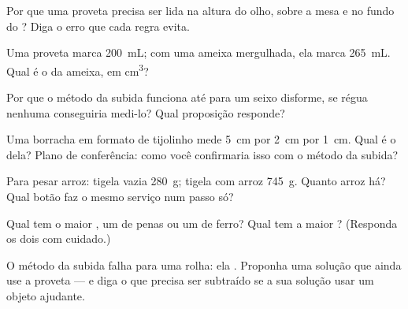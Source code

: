 \begin{exercise}[$\star$]\label{exo:g6:mass-and-volume:3}
Por que uma proveta precisa ser lida na altura do olho, sobre a mesa
e no fundo do ? Diga o erro que cada regra evita.
\end{exercise}

\begin{exercise}[$\star$]\label{exo:g6:mass-and-volume:4}
Uma proveta marca \qty{200}{mL}; com uma ameixa mergulhada, ela marca
\qty{265}{mL}. Qual é o  da ameixa, em \unit{cm^3}?
\end{exercise}

\begin{exercise}[$\star$]\label{exo:g6:mass-and-volume:5}
Por que o método da subida funciona até para um seixo disforme, se
régua nenhuma conseguiria medi-lo? Qual proposição responde?
\end{exercise}

\begin{exercise}[$\star$]\label{exo:g6:mass-and-volume:6}
Uma borracha em formato de tijolinho mede \qty{5}{cm} por \qty{2}{cm}
por \qty{1}{cm}. Qual é o  dela? Plano de conferência: como
você confirmaria isso com o método da subida?
\end{exercise}

\begin{exercise}[$\star$]\label{exo:g6:mass-and-volume:7}
Para pesar arroz: tigela vazia \qty{280}{g}; tigela com arroz
\qty{745}{g}. Quanto arroz há? Qual botão faz o mesmo serviço num
passo só?
\end{exercise}

\begin{exercise}[$\star$]\label{exo:g6:mass-and-volume:8}
Qual tem o maior , um  de penas ou um  de
ferro? Qual tem a maior ? (Responda os dois com cuidado.)
\end{exercise}

\begin{exercise}[$\star\star$]\label{exo:g6:mass-and-volume:9}
O método da subida falha para uma rolha: ela . Proponha uma
solução que ainda use a proveta --- e diga o que precisa ser
subtraído se a sua solução usar um objeto ajudante.
\end{exercise}


